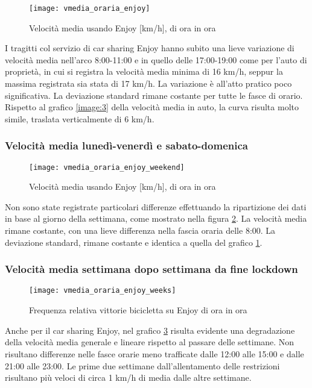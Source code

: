 \begin{figure}[H]
\texttt{[image: vmedia\_oraria\_enjoy]}
\caption{Velocità media usando Enjoy [km/h], di ora in ora}
\label{image:7}
\end{figure}

I tragitti col servizio di car sharing Enjoy hanno subito una lieve variazione di velocità media nell'arco 8:00-11:00 e in quello delle 17:00-19:00 come per l'auto di proprietà, in cui si registra la velocità media minima di 16 km/h, seppur la massima registrata sia stata di 17 km/h. La variazione è all'atto pratico poco significativa. La deviazione standard rimane costante per tutte le fasce di orario. Rispetto al grafico \ref{image:3} della velocità media in auto, la curva risulta molto simile, traslata verticalmente di 6 km/h.

\subsubsection{Velocità media lunedì-venerdì e sabato-domenica}

\begin{figure}[H]
	\texttt{[image: vmedia\_oraria\_enjoy\_weekend]}
	\caption{Velocità media usando Enjoy [km/h], di ora in ora}
	\label{image:20}
\end{figure}

Non sono state registrate particolari differenze effettuando la ripartizione dei dati in base al giorno della settimana, come mostrato nella figura \ref{image:20}. La velocità media rimane costante, con una lieve differenza nella fascia oraria delle 8:00. La deviazione standard, rimane costante e identica a quella del grafico \ref{image:7}.

\subsubsection{Velocità media settimana dopo settimana da fine lockdown}

\begin{figure}[H]
	\texttt{[image: vmedia\_oraria\_enjoy\_weeks]}
	\caption{Frequenza relativa vittorie bicicletta su Enjoy di ora in ora}
	\label{image:16}
\end{figure}

Anche per il car sharing Enjoy, nel grafico \ref{image:16} risulta evidente una degradazione della velocità media generale e lineare rispetto al passare delle settimane. Non risultano differenze nelle fasce orarie meno trafficate dalle 12:00 alle 15:00 e dalle 21:00 alle 23:00. Le prime due settimane dall'allentamento delle restrizioni risultano più veloci di circa 1 km/h di media dalle altre settimane.

